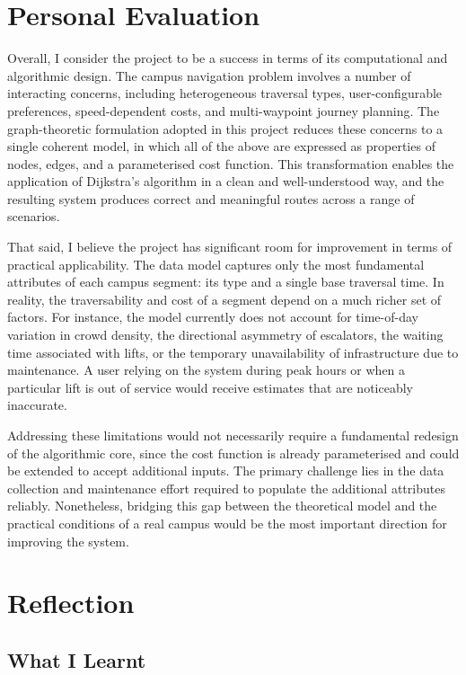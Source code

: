 \documentclass[a4paper,10pt]{amsart}
\begin{document}
\section{Personal Evaluation}

Overall, I consider the project to be a success in terms of its computational and algorithmic design.
The campus navigation problem involves a number of interacting concerns, including heterogeneous traversal types, user-configurable preferences, speed-dependent costs, and multi-waypoint journey planning.
The graph-theoretic formulation adopted in this project reduces these concerns to a single coherent model, in which all of the above are expressed as properties of nodes, edges, and a parameterised cost function.
This transformation enables the application of Dijkstra's algorithm in a clean and well-understood way, and the resulting system produces correct and meaningful routes across a range of scenarios.

That said, I believe the project has significant room for improvement in terms of practical applicability.
The data model captures only the most fundamental attributes of each campus segment: its type and a single base traversal time.
In reality, the traversability and cost of a segment depend on a much richer set of factors.
For instance, the model currently does not account for time-of-day variation in crowd density, the directional asymmetry of escalators, the waiting time associated with lifts, or the temporary unavailability of infrastructure due to maintenance.
A user relying on the system during peak hours or when a particular lift is out of service would receive estimates that are noticeably inaccurate.

Addressing these limitations would not necessarily require a fundamental redesign of the algorithmic core, since the cost function is already parameterised and could be extended to accept additional inputs.
The primary challenge lies in the data collection and maintenance effort required to populate the additional attributes reliably.
Nonetheless, bridging this gap between the theoretical model and the practical conditions of a real campus would be the most important direction for improving the system.

\section{Reflection}

\subsection{What I Learnt}
\end{document}
